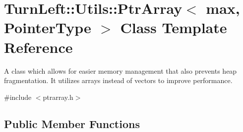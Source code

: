 \hypertarget{classTurnLeft_1_1Utils_1_1PtrArray}{
\section{TurnLeft::Utils::PtrArray$<$ max, PointerType $>$ Class Template Reference}
\label{classTurnLeft_1_1Utils_1_1PtrArray}
}


A class which allows for easier memory management that also prevents heap fragmentation. It utilizes arrays instead of vectors to improve performance.  




{\ttfamily \#include $<$ptrarray.h$>$}

\subsection*{Public Member Functions}
